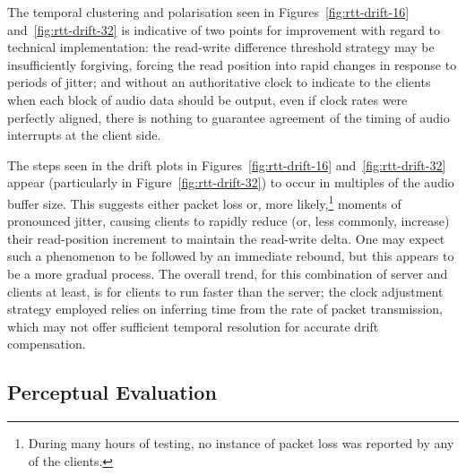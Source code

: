 \documentclass[utf8]{FrontiersinHarvard}
\newcommand{\figref}[1]{Figure~\ref{#1}}
\newcommand{\figsref}[2]{Figures~\ref{#1} and~\ref{#2}}
\begin{document}
    The temporal clustering and polarisation seen in
    \figsref{fig:rtt-drift-16}{fig:rtt-drift-32} is indicative of two points for
    improvement with regard to technical implementation:
    the read-write difference threshold strategy may be insufficiently forgiving,
    forcing the read position into rapid changes in response to periods of jitter;
    and without an authoritative clock to indicate to the clients when each block of
    audio data should be output, even if clock rates were perfectly aligned, there
    is nothing to guarantee agreement of the timing of audio interrupts at the
    client side.

    The steps seen in the drift plots in
    \figsref{fig:rtt-drift-16}{fig:rtt-drift-32} appear (particularly in
    \figref{fig:rtt-drift-32}) to occur in multiples of the audio buffer size.
    This suggests either packet loss or, more likely,\footnote{
        During many hours of testing, no instance of packet loss was reported by any
        of the clients.
    } moments of pronounced jitter, causing
    clients to rapidly reduce (or, less commonly, increase) their read-position
    increment to maintain the read-write delta.
    One may expect such a phenomenon to be followed by an immediate rebound, but
    this appears to be a more gradual process.
    The overall trend, for this combination of server and clients at least, is for
    clients to run faster than the server;
    the clock adjustment strategy employed relies on inferring time from the rate of
    packet transmission, which may not offer sufficient temporal resolution for
    accurate drift compensation.

    \subsection{Perceptual Evaluation}\label{subsec:perceptual-evaluation}
\end{document}
